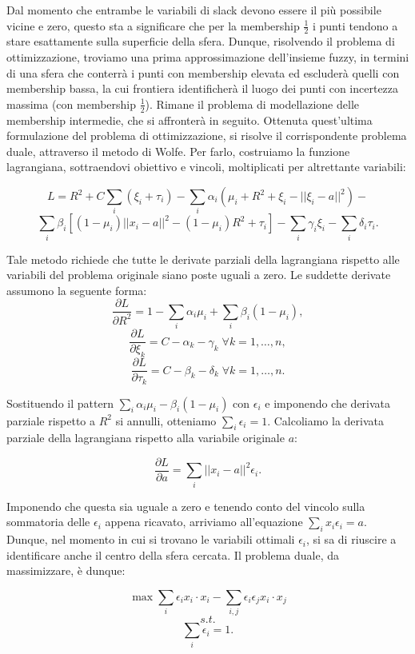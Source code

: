 \documentclass[12pt,a4paper]{report}
\begin{document}
Dal momento che entrambe le variabili di slack devono essere il più possibile vicine e zero, questo sta a significare che per la membership  $\frac{1}{2}$ i punti tendono a stare esattamente sulla superficie della sfera. Dunque, risolvendo il problema di ottimizzazione, troviamo una prima approssimazione dell'insieme fuzzy, in termini di una sfera che conterrà i punti con membership elevata ed escluderà quelli con membership bassa, la cui frontiera identificherà il luogo dei punti con incertezza massima (con membership  $\frac{1}{2}$). Rimane il problema di modellazione delle membership intermedie, che si affronterà in seguito.
Ottenuta quest'ultima formulazione del problema di ottimizzazione, si risolve il corrispondente problema duale, attraverso il metodo di Wolfe. Per farlo, costruiamo la funzione lagrangiana, sottraendovi obiettivo e vincoli, moltiplicati per altrettante variabili:

\[ L = R^2 + C\sum_{i}(\xi_i + \tau_i) - \sum_{i}\alpha_i(\mu_i+R^2 + \xi_i - ||\xi_i - a||^2) -\] 
\[\sum_{i}\beta_i[(1- \mu_i)||x_i - a||^2 - (1 - \mu_i)R^2 + \tau_i] -  \sum_{i}\gamma_i\xi_i - \sum_{i}\delta_i\tau_i.\]

Tale metodo richiede che tutte le derivate parziali della lagrangiana rispetto alle variabili del problema originale siano poste uguali a zero. Le suddette derivate assumono la seguente forma:
\[ \frac{\partial L}{\partial R^2} = 1- \sum_{i}\alpha_i\mu_i + \sum_{i}\beta_i(1 - \mu_i),\]
\[ \frac{\partial L}{\partial \xi_k} = C - 	\alpha_k - \gamma_k  \; \forall k = 1, \dots, n,\]
\[ \frac{\partial L}{\partial \tau_k} = C - \beta_k - \delta_k  \; \forall k = 1, \dots, n.\]

Sostituendo il pattern $\sum_{i}\alpha_i\mu_i - \beta_i(1-\mu_i)$ con $\epsilon_i$ e imponendo che derivata parziale rispetto a $R^2$ si annulli, otteniamo $\sum_{i}\epsilon_i = 1$.
Calcoliamo la derivata parziale della lagrangiana rispetto alla variabile originale $a$:

\[ \frac{\partial L}{\partial a} = \sum_{i}||x_i - a||^2\epsilon_i.\]

Imponendo che questa sia uguale a zero e tenendo conto del vincolo sulla sommatoria delle $\epsilon_i$ appena ricavato,  arriviamo all'equazione  $\sum_{i}x_i\epsilon_i = a$. Dunque, nel momento in cui si trovano le variabili ottimali $\epsilon_i$, si sa di riuscire a identificare anche il centro della sfera cercata.
Il problema duale, da massimizzare, è dunque:

\[ \max \sum_{i}\epsilon_ix_i\cdot x_i - \sum_{i,j}\epsilon_i\epsilon_jx_i\cdot x_j\]
\[s.t.\]
\[\sum_i\epsilon_i = 1.\]
\end{document}
